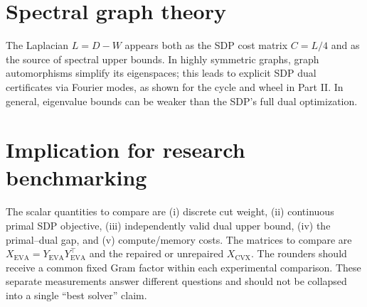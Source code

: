 \section{Spectral graph theory}
The Laplacian $L=D-W$ appears both as the SDP cost matrix $C=L/4$ and as the source of spectral upper bounds. In highly symmetric graphs, graph automorphisms simplify its eigenspaces; this leads to explicit SDP dual certificates via Fourier modes, as shown for the cycle and wheel in Part II. In general, eigenvalue bounds can be weaker than the SDP's full dual optimization.

\section{Implication for research benchmarking}
The scalar quantities to compare are (i) discrete cut weight, (ii) continuous primal SDP objective, (iii) independently valid dual upper bound, (iv) the primal--dual gap, and (v) compute/memory costs. The matrices to compare are $X_{\mathrm{EVA}}=Y_{\mathrm{EVA}}Y_{\mathrm{EVA}}^\top$ and the repaired or unrepaired $X_{\mathrm{CVX}}$. The rounders should receive a common fixed Gram factor within each experimental comparison. These separate measurements answer different questions and should not be collapsed into a single ``best solver'' claim.
